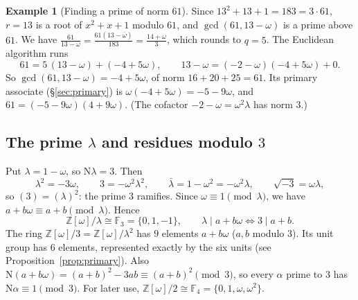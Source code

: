 \documentclass[11pt]{article}
\numberwithin{equation}{section}
\newcommand{\N}{\mathrm N}
\newcommand{\OO}{\mathbb Z[\omega]}
\newcommand{\F}{\mathbb F}
\theoremstyle{definition}
\newtheorem{example}[theorem]{Example}
\theoremstyle{remark}
\begin{document}
\begin{example}[Finding a prime of norm $61$]\label{ex:euclid}
Since $13^2+13+1=183=3\cdot61$, $r=13$ is a root of $x^2+x+1$ modulo $61$, and
$\gcd(61,13-\omega)$ is a prime above $61$. We have
$\frac{61}{13-\omega}=\frac{61(13-\bar\omega)}{183}=\frac{14+\omega}3$, which rounds to $q=5$.
The Euclidean algorithm runs
\begin{equation}\label{eq:euclid61}
 61=5\,(13-\omega)+(-4+5\omega),\qquad
 13-\omega=(-2-\omega)(-4+5\omega)+0 .
\end{equation}
So $\gcd(61,13-\omega)=-4+5\omega$, of norm $16+20+25=61$. Its primary associate
(\S\ref{sec:primary}) is $\omega(-4+5\omega)=-5-9\omega$, and
$61=(-5-9\omega)(4+9\omega)$. (The cofactor $-2-\omega=\omega^2\lambda$ has norm $3$.)
\end{example}

\subsection{The prime \texorpdfstring{$\lambda$}{lambda} and residues modulo \texorpdfstring{$3$}{3}}
Put $\lambda=1-\omega$, so $\N\lambda=3$. Then
\begin{equation}\label{eq:lambda}
 \lambda^2=-3\omega,\qquad 3=-\omega^2\lambda^2,\qquad \bar\lambda=1-\omega^2=-\omega^2\lambda,
 \qquad \sqrt{-3}=\omega\lambda,
\end{equation}
so $(3)=(\lambda)^2$: the prime $3$ ramifies. Since $\omega\equiv1\pmod\lambda$, we have
$a+b\omega\equiv a+b\pmod\lambda$. Hence
\begin{equation}\label{eq:modlambda}
 \OO/\lambda\cong\F_3=\{0,1,-1\},\qquad \lambda\mid a+b\omega\iff 3\mid a+b .
\end{equation}
The ring $\OO/3=\OO/\lambda^2$ has $9$ elements $a+b\omega$ ($a,b$ modulo $3$). Its unit
group has $6$ elements, represented exactly by the six units (see
Proposition~\ref{prop:primary}). Also $\N(a+b\omega)=(a+b)^2-3ab\equiv(a+b)^2\pmod 3$, so
every $\alpha$ prime to $3$ has $\N\alpha\equiv1\pmod 3$. For later use,
$\OO/2\cong\F_4=\{0,1,\omega,\omega^2\}$.
\end{document}
